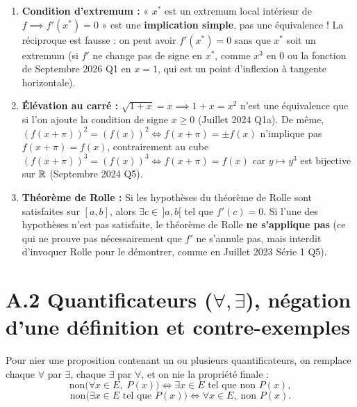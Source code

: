 \begin{attention}
\begin{enumerate}
    \item \textbf{Condition d'extremum :} « $x^*$ est un extremum local intérieur de $f \implies f'(x^*) = 0$ » est une \textbf{implication simple}, pas une équivalence ! La réciproque est fausse : on peut avoir $f'(x^*) = 0$ sans que $x^*$ soit un extremum (si $f'$ ne change pas de signe en $x^*$, comme $x^3$ en $0$ ou la fonction de Septembre 2026 Q1 en $x = 1$, qui est un point d'inflexion à tangente horizontale).
    \item \textbf{Élévation au carré :} $\sqrt{1+x} = x \implies 1 + x = x^2$ n'est une équivalence que si l'on ajoute la condition de signe $x \ge 0$ (Juillet 2024 Q1a). De même, $(f(x+\pi))^2 = (f(x))^2 \iff f(x+\pi) = \pm f(x)$ n'implique pas $f(x+\pi) = f(x)$, contrairement au cube $(f(x+\pi))^3 = (f(x))^3 \iff f(x+\pi) = f(x)$ car $y \mapsto y^3$ est bijective sur $\mathbb{R}$ (Septembre 2024 Q5).
    \item \textbf{Théorème de Rolle :} Si les hypothèses du théorème de Rolle sont satisfaites sur $[a, b]$, alors $\exists c \in \,]a, b[$ tel que $f'(c) = 0$. Si l'une des hypothèses n'est pas satisfaite, le théorème de Rolle \textbf{ne s'applique pas} (ce qui ne prouve pas nécessairement que $f'$ ne s'annule pas, mais interdit d'invoquer Rolle pour le démontrer, comme en Juillet 2023 Série 1 Q5).
\end{enumerate}
\end{attention}

\section*{A.2 Quantificateurs ($\forall, \exists$), négation d'une définition et contre-exemples}

\begin{theoreme}
Pour nier une proposition contenant un ou plusieurs quantificateurs, on remplace chaque $\forall$ par $\exists$, chaque $\exists$ par $\forall$, et on nie la propriété finale :
\[
    \boxed{\text{non}\bigl(\forall x \in E,\; P(x)\bigr) \iff \exists x \in E \text{ tel que } \text{non } P(x)},
\]
\[
    \boxed{\text{non}\bigl(\exists x \in E \text{ tel que } P(x)\bigr) \iff \forall x \in E,\; \text{non } P(x)}.
\]
\end{theoreme}

